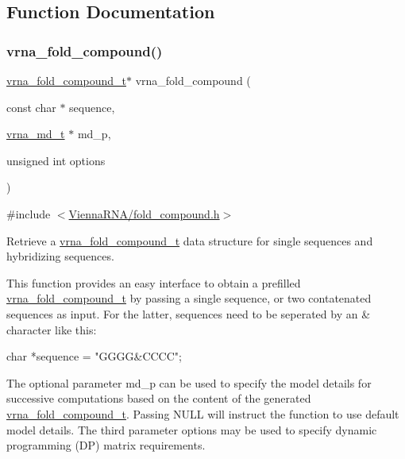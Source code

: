 \subsection{Function Documentation}
\mbox{\label{group__fold__compound_ga6601d994ba32b11511b36f68b08403be}} 
\subsubsection{\texorpdfstring{vrna\_fold\_compound()}{vrna\_fold\_compound()}}
{\footnotesize\ttfamily \mbox{\hyperlink{group__fold__compound_ga1b0cef17fd40466cef5968eaeeff6166}{vrna\+\_\+fold\+\_\+compound\+\_\+t}}$\ast$ vrna\+\_\+fold\+\_\+compound (\begin{DoxyParamCaption}\item[{const char $\ast$}]{sequence,  }\item[{\mbox{\hyperlink{group__model__details_ga1f8a10e12a0a1915f2a4eff0b28ea17c}{vrna\+\_\+md\+\_\+t}} $\ast$}]{md\+\_\+p,  }\item[{unsigned int}]{options }\end{DoxyParamCaption})}



{\ttfamily \#include $<$\mbox{\hyperlink{fold__compound_8h}{Vienna\+R\+N\+A/fold\+\_\+compound.\+h}}$>$}



Retrieve a \mbox{\hyperlink{group__fold__compound_ga1b0cef17fd40466cef5968eaeeff6166}{vrna\+\_\+fold\+\_\+compound\+\_\+t}} data structure for single sequences and hybridizing sequences. 

This function provides an easy interface to obtain a prefilled \mbox{\hyperlink{group__fold__compound_ga1b0cef17fd40466cef5968eaeeff6166}{vrna\+\_\+fold\+\_\+compound\+\_\+t}} by passing a single sequence, or two contatenated sequences as input. For the latter, sequences need to be seperated by an \textquotesingle{}\&\textquotesingle{} character like this\+:\begin{DoxyVerb}char *sequence = "GGGG&CCCC"; \end{DoxyVerb}


The optional parameter {\ttfamily md\+\_\+p} can be used to specify the model details for successive computations based on the content of the generated \mbox{\hyperlink{group__fold__compound_ga1b0cef17fd40466cef5968eaeeff6166}{vrna\+\_\+fold\+\_\+compound\+\_\+t}}. Passing N\+U\+LL will instruct the function to use default model details. The third parameter {\ttfamily options} may be used to specify dynamic programming (DP) matrix requirements.

